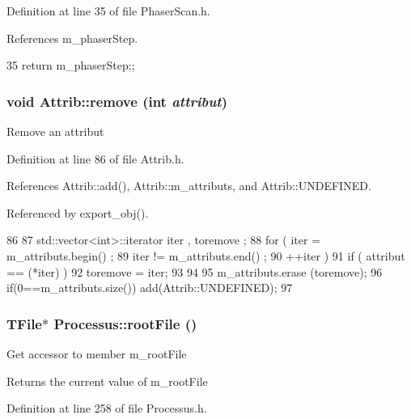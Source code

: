 Definition at line 35 of file PhaserScan.h.

References m\_\-phaserStep.


\begin{DoxyCode}
35 {return m_phaserStep;};
\end{DoxyCode}
\hypertarget{classAttrib_a7d4ef7e32d93cb287792b87b857e79f3}{
\subsubsection[{remove}]{\setlength{\rightskip}{0pt plus 5cm}void Attrib::remove (int {\em attribut})}}
\label{classAttrib_a7d4ef7e32d93cb287792b87b857e79f3}
Remove an attribut 

Definition at line 86 of file Attrib.h.

References Attrib::add(), Attrib::m\_\-attributs, and Attrib::UNDEFINED.

Referenced by export\_\-obj().


\begin{DoxyCode}
86                                {
87     std::vector<int>::iterator iter , toremove ;
88     for ( iter  = m_attributs.begin() ;
89           iter != m_attributs.end()   ;
90           ++iter ) {
91       if ( attribut == (*iter) ) {
92         toremove = iter;
93       }
94     }
95     m_attributs.erase (toremove);
96     if(0==m_attributs.size()) add(Attrib::UNDEFINED);
97   }
\end{DoxyCode}
\hypertarget{classProcessus_a247e8c362ec08422cf53d08dd23b093c}{
\subsubsection[{rootFile}]{\setlength{\rightskip}{0pt plus 5cm}TFile$\ast$ Processus::rootFile ()}}
\label{classProcessus_a247e8c362ec08422cf53d08dd23b093c}
Get accessor to member m\_\-rootFile \begin{DoxyReturn}{Returns}
the current value of m\_\-rootFile 
\end{DoxyReturn}


Definition at line 258 of file Processus.h.

